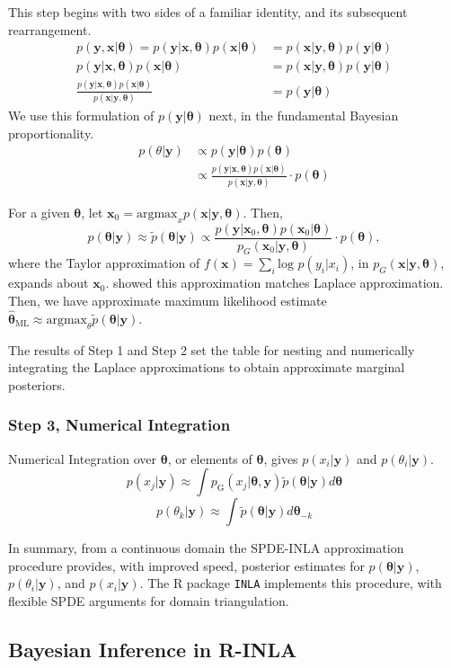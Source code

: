 This step begins with two sides of a familiar identity, and its subsequent rearrangement.
\begin{align}
p(\pmb{y} , \pmb{x} | \pmb{\theta}) = p(\pmb{y} | \pmb{x}, \pmb{\theta}) p(\pmb{x} | \pmb{\theta})  &= p(\pmb{x} | \pmb{y}, \pmb{\theta}) p(\pmb{y} | \pmb{\theta}) \\
p(\pmb{y} | \pmb{x}, \pmb{\theta}) p(\pmb{x} | \pmb{\theta}) &= p(\pmb{x} | \pmb{y}, \pmb{\theta}) p(\pmb{y} | \pmb{\theta}) \\
\frac{p(\pmb{y} | \pmb{x}, \pmb{\theta}) p(\pmb{x} | \pmb{\theta})} {p(\pmb{x} | \pmb{y}, \pmb{\theta})} &= p(\pmb{y} | \pmb{\theta})  
\end{align}
We use this formulation of $p(\pmb{y} | \pmb{\theta})$ next, in the fundamental Bayesian proportionality.
\begin{align}
p(\theta|\pmb{y}) & \propto p(\pmb{y}|\pmb{\theta})p(\pmb{\theta}) \\
& \propto \frac{p(\pmb{y} | \pmb{x}, \pmb{\theta}) p(\pmb{x} | \pmb{\theta})}{p(\pmb{x} | \pmb{y}, \pmb{\theta})} \cdot p(\pmb{\theta})
\end{align}

For a given $\pmb{\theta}$, let $\pmb{x}_{0} = \text{argmax}_{x}p(\pmb{x}|\pmb{y},\pmb{\theta})$. Then,
$$ p(\pmb{\theta}|\pmb{y}) \approx \tilde{p}(\pmb{\theta}|\pmb{y}) \propto  \frac{p(\pmb{y} | \pmb{x}_{0}, \pmb{\theta}) p(\pmb{x}_{0} | \pmb{\theta})}{p_{G}(\pmb{x}_{0} | \pmb{y}, \pmb{\theta})} \cdot p(\pmb{\theta}),$$
where the Taylor approximation of $f(\pmb{x}) = \sum_{i} \text{log }p(y_{i}|x_{i})$, in $p_{G}(\pmb{x} | \pmb{y}, \pmb{\theta})$, expands about $\pmb{x}_{0}$. \cite{Tierney1986} showed this approximation matches Laplace approximation.  Then, we have approximate maximum likelihood estimate $\hat{\pmb{\theta}}_{\text{ML}} \approx \text{argmax}_{\theta} \tilde{p}(\pmb{\theta}|\pmb{y})$.

The results of Step 1 and Step 2 set the table for nesting and numerically integrating the Laplace approximations to obtain approximate marginal posteriors.

\subsubsection{Step 3, Numerical Integration} %
Numerical Integration over $\pmb{\theta}$, or elements of $\pmb{\theta}$, gives $p(x_{i}|\pmb{y})$ and $p(\theta_{i}|\pmb{y})$.
        $$ p(x_{j} | \pmb{y}) \approx \int p_{\text{G}}(x_{j}|\pmb{\theta, y})\tilde{p}(\pmb{\theta}|\pmb{y}) d\pmb{\theta} $$
        $$ p(\theta_{k} | \pmb{y}) \approx \int \tilde{p}(\pmb{\theta}|\pmb{y}) d\pmb{\theta}_{-k} $$

In summary, from a continuous domain the SPDE-INLA approximation procedure provides, with improved speed, posterior estimates for $p(\pmb{\theta}|\pmb{y})$, $p(\theta_{i}|\pmb{y})$, and $p(x_{i}|\pmb{y})$. The R package \verb|INLA| implements this procedure, with flexible SPDE arguments for domain triangulation.

\subsection{Bayesian Inference in R-INLA}